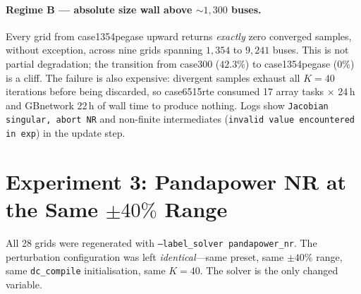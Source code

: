 \documentclass{article}
\begin{document}
\paragraph{Regime B --- absolute size wall above ${\sim}1{,}300$ buses.}
Every grid from case1354pegase upward returns \emph{exactly} zero converged
samples, without exception, across nine grids spanning $1{,}354$ to $9{,}241$
buses.  This is not partial degradation; the transition from case300
($42.3\%$) to case1354pegase ($0\%$) is a cliff.  The failure is also
expensive: divergent samples exhaust all $K{=}40$ iterations before being
discarded, so case6515rte consumed 17 array tasks $\times$ 24\,h and
GBnetwork 22\,h of wall time to produce nothing.  Logs show
\texttt{Jacobian singular, abort NR} and non-finite intermediates
(\texttt{invalid value encountered in exp}) in the update step.


\section{Experiment 3: Pandapower NR at the Same $\pm40\%$ Range}

All 28 grids were regenerated with \texttt{--label\_solver pandapower\_nr}.
The perturbation configuration was left \emph{identical}---same preset, same
$\pm40\%$ range, same \texttt{dc\_compile} initialisation, same $K{=}40$.
The solver is the only changed variable.
\end{document}
